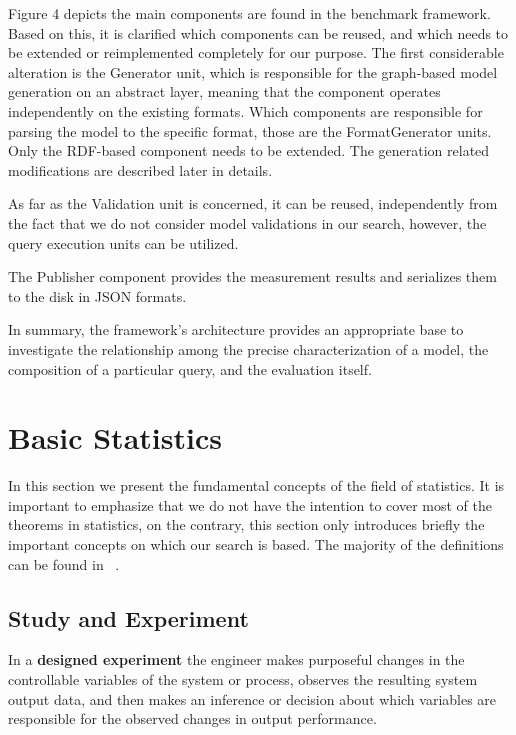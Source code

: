 Figure 4 depicts the main components are found in the benchmark framework. Based on this, it is clarified which components can be reused, and which needs to be extended or reimplemented completely for our purpose. The first considerable alteration is the \textsf{Generator} unit, which is responsible for the graph-based model generation on an abstract layer, meaning that the component operates independently on the existing formats. Which components are responsible for parsing the model to the specific format, those are the \textsf{FormatGenerator} units. Only the RDF-based component needs to be extended. The generation related modifications are described later in details.

As far as the \textsf{Validation} unit is concerned, it can be reused, independently from the fact that we do not consider model validations in our search, however, the query execution units can be utilized.

The \textsf{Publisher} component provides the measurement results and serializes them to the disk in JSON formats.

In summary, the framework's architecture provides an appropriate base to investigate the relationship among the precise characterization of a model, the composition of a particular query, and the evaluation itself.

\section{Basic Statistics} \label{section:distributions}
In this section we present the fundamental concepts of the field of statistics. It is important to emphasize that we do not have the intention to cover most of the theorems in statistics, on the contrary, this section only introduces briefly the important concepts on which our search is based. The majority of the definitions can be found in ~\cite{statistics_book}.

\subsection{Study and Experiment}

In a \textbf{designed experiment} the engineer makes purposeful changes in the controllable
variables of the system or process, observes the resulting system output data, and then
makes an inference or decision about which variables are responsible for the observed changes
in output performance. 

